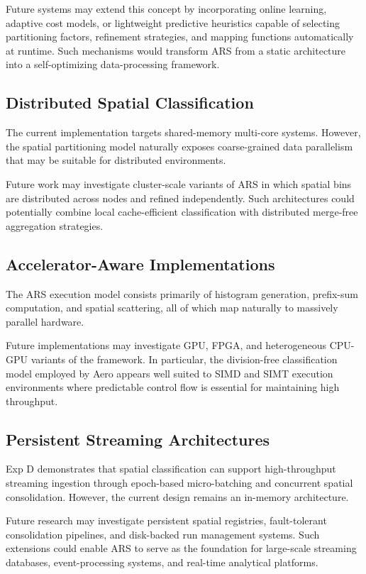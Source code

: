 Future systems may extend this concept by incorporating online learning, adaptive cost models, or lightweight predictive heuristics capable of selecting partitioning factors, refinement strategies, and mapping functions automatically at runtime.
Such mechanisms would transform ARS from a static architecture into a self-optimizing data-processing framework.

\subsection{Distributed Spatial Classification}
The current implementation targets shared-memory multi-core systems.
However, the spatial partitioning model naturally exposes coarse-grained data parallelism that may be suitable for distributed environments.

Future work may investigate cluster-scale variants of ARS in which spatial bins are distributed across nodes and refined independently.
Such architectures could potentially combine local cache-efficient classification with distributed merge-free aggregation strategies.

\subsection{Accelerator-Aware Implementations}
The ARS execution model consists primarily of histogram generation, prefix-sum computation, and spatial scattering, all of which map naturally to massively parallel hardware.

Future implementations may investigate GPU, FPGA, and heterogeneous CPU-GPU variants of the framework.
In particular, the division-free classification model employed by Aero appears well suited to SIMD and SIMT execution environments where predictable control flow is essential for maintaining high throughput.

\subsection{Persistent Streaming Architectures}
Exp D demonstrates that spatial classification can support high-throughput streaming ingestion through epoch-based micro-batching and concurrent spatial consolidation.
However, the current design remains an in-memory architecture.

Future research may investigate persistent spatial registries, fault-tolerant consolidation pipelines, and disk-backed run management systems.
Such extensions could enable ARS to serve as the foundation for large-scale streaming databases, event-processing systems, and real-time analytical platforms.

